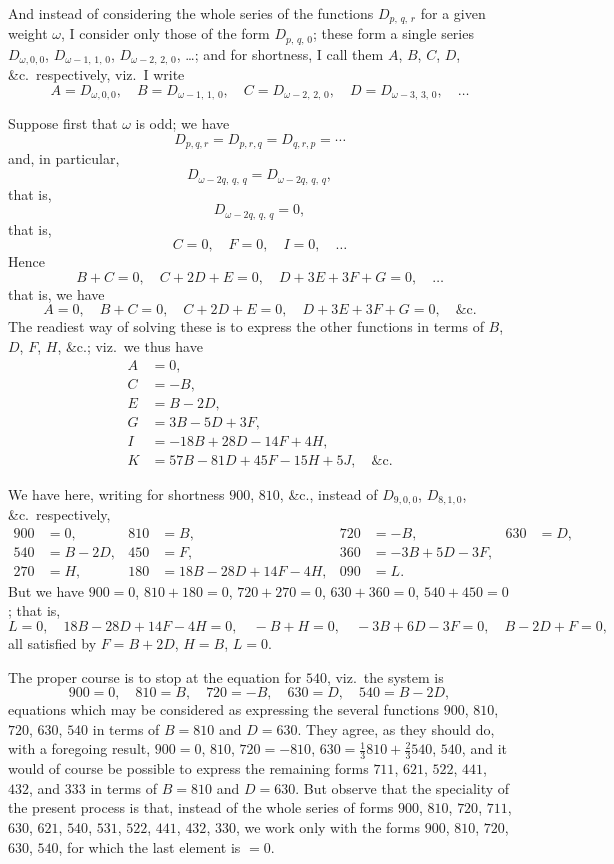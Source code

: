 \documentclass[11pt,a4paper]{article}
\theoremstyle{definition}
\begin{document}
And instead of considering the whole series of the functions $D_{p,\,q,\,r}$ for a given weight $\omega$, I consider only those of the form $D_{p,\,q,\,0}$; these form a single series $D_{\omega,0,0}$, $D_{\omega-1,\,1,\,0}$, $D_{\omega-2,\,2,\,0}$, \ldots; and for shortness, I call them $A$, $B$, $C$, $D$, \&c.\ respectively, viz.\ I write
\[
A = D_{\omega,0,0}, \quad B = D_{\omega-1,\,1,\,0}, \quad C = D_{\omega-2,\,2,\,0}, \quad D = D_{\omega-3,\,3,\,0}, \quad \ldots
\]

Suppose first that $\omega$ is odd; we have
\[
D_{p,q,r} = D_{p,r,q} = D_{q,r,p} = \cdots
\]
and, in particular,
\[
D_{\omega-2q,\,q,\,q} = D_{\omega-2q,\,q,\,q},
\]
that is,
\[
D_{\omega-2q,\,q,\,q} = 0,
\]
that is,
\[
C = 0, \quad F = 0, \quad I = 0, \quad \ldots
\]
Hence
\[
B + C = 0, \quad C + 2D + E = 0, \quad D + 3E + 3F + G = 0, \quad \ldots
\]
that is, we have
\[
A = 0, \quad B + C = 0, \quad C + 2D + E = 0, \quad D + 3E + 3F + G = 0, \quad \text{\&c.}
\]
The readiest way of solving these is to express the other functions in terms of $B$, $D$, $F$, $H$, \&c.; viz.\ we thus have
\begin{align*}
A &= 0,\\
C &= -B,\\
E &= B - 2D,\\
G &= 3B - 5D + 3F,\\
I &= -18B + 28D - 14F + 4H,\\
K &= 57B - 81D + 45F - 15H + 5J, \quad \text{\&c.}
\end{align*}

We have here, writing for shortness $900$, $810$, \&c., instead of $D_{9,0,0}$, $D_{8,1,0}$, \&c.\ respectively,
\begin{align*}
900 &= 0, & 810 &= B, & 720 &= -B, & 630 &= D,\\
540 &= B - 2D, & 450 &= F, & 360 &= -3B + 5D - 3F,\\
270 &= H, & 180 &= 18B - 28D + 14F - 4H, & 090 &= L.
\end{align*}
But we have $900 = 0$, $810 + 180 = 0$, $720 + 270 = 0$, $630 + 360 = 0$, $540 + 450 = 0$; that is,
\[
L = 0, \quad 18B - 28D + 14F - 4H = 0, \quad -B + H = 0, \quad -3B + 6D - 3F = 0, \quad B - 2D + F = 0,
\]
all satisfied by $F = B + 2D$, $H = B$, $L = 0$.

The proper course is to stop at the equation for $540$, viz.\ the system is
\[
900 = 0, \quad 810 = B, \quad 720 = -B, \quad 630 = D, \quad 540 = B - 2D,
\]
equations which may be considered as expressing the several functions $900$, $810$, $720$, $630$, $540$ in terms of $B = 810$ and $D = 630$. They agree, as they should do, with a foregoing result, $900 = 0$, $810$, $720 = -810$, $630 = \frac{1}{3}810 + \frac{2}{3}540$, $540$, and it would of course be possible to express the remaining forms $711$, $621$, $522$, $441$, $432$, and $333$ in terms of $B = 810$ and $D = 630$. But observe that the speciality of the present process is that, instead of the whole series of forms $900$, $810$, $720$, $711$, $630$, $621$, $540$, $531$, $522$, $441$, $432$, $330$, we work only with the forms $900$, $810$, $720$, $630$, $540$, for which the last element is $= 0$.
\end{document}
